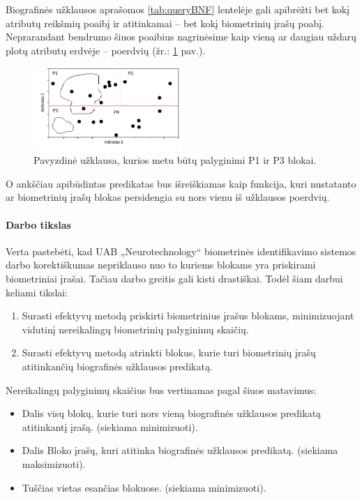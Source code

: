 Biografinės užklausos aprašomos \ref{tab:queryBNF} lentelėje gali apibrėžti bet kokį atributų reikšmių poaibį ir atitinkamai -- bet kokį biometrinių įrašų poabį.
Neprarandant bendrumo šiuos poaibius nagrinėsime kaip vieną ar daugiau uždarų plotų atributų erdvėje -- poerdvių (žr.: \ref{img:multidimensionalPartitionedGalleryWithQuery} pav.). %

\begin{figure}[H]
\begin{center}
\includegraphics[width=0.5\textwidth]{img/MultidimensionalPartitionedGalleryWithQuery.png}
\caption{Pavyzdinė užklausa, kurios metu būtų palyginimi P1 ir P3 blokai.}
\label{img:multidimensionalPartitionedGalleryWithQuery}
\end{center}
\end{figure}

O ankščiau apibūdintas predikatas bus išreiškiamas kaip funkcija, kuri nustatanto ar biometrinių įrašų blokas persidengia su nors vienu iš užklausos poerdvių.

\paragraph{Darbo tikslas}

Verta pastebėti, kad UAB „Neurotechnology“ biometrinės identifikavimo sistemos darbo korektiškumas nepriklauso nuo to kuriems blokams yra priskirami biometriniai įrašai.
Tačiau darbo greitis gali kisti drastiškai.
Todėl šiam darbui keliami tikslai:
\begin{enumerate}
	\item Surasti efektyvų metodą priskirti biometrinius įrašus blokams, minimizuojant vidutinį nereikalingų biometrinių palyginimų skaičių.
	\item Surasti efektyvų metodą atrinkti blokus, kurie turi biometrinių įrašų atitinkančių biografinės užklausos predikatą.
\end{enumerate}

Nereikalingų palyginimų skaičius bus vertinamas pagal šiuos matavimus:
\begin{itemize}
	\item Dalis visų blokų, kurie turi nors vieną biografinės užklausos predikatą atitinkantį įrašą. (siekiama minimizuoti).
	\item Dalis Bloko įrašų, kuri atitinka biografinės užklausos predikatą. (siekiama maksimizuoti).
	\item Tuščias vietas esančias blokuose. (siekiama minimizuoti).
\end{itemize}

